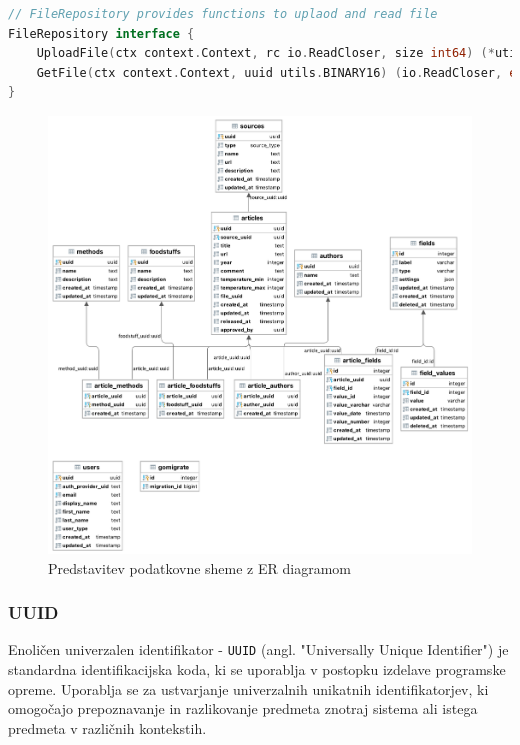 \documentclass[a4paper, 12pt]{book}
\begin{document}
\begin{lstlisting}[language=go,style=mystyle,caption={Prikaz vmestnika za shranjevanje in branje datotek},label=lst:file-interface]
// FileRepository provides functions to uplaod and read file
FileRepository interface {
	UploadFile(ctx context.Context, rc io.ReadCloser, size int64) (*utils.BINARY16, error)
	GetFile(ctx context.Context, uuid utils.BINARY16) (io.ReadCloser, error)
}
\end{lstlisting}


\begin{figure}[ht]
\begin{center}
\includegraphics[width=1\textwidth]{slike/database-structure.png}
\end{center}
\caption{ Predstavitev podatkovne sheme z ER diagramom }
\label{database-diagram-er}
\end{figure}

\subsubsection{UUID}
Enoličen univerzalen identifikator - \verb=UUID= (angl. "Universally Unique Identifier") je standardna identifikacijska koda, ki se uporablja v postopku izdelave programske opreme. Uporablja se za ustvarjanje univerzalnih unikatnih identifikatorjev, ki omogočajo prepoznavanje in razlikovanje predmeta znotraj sistema ali istega predmeta v različnih kontekstih.
\end{document}
